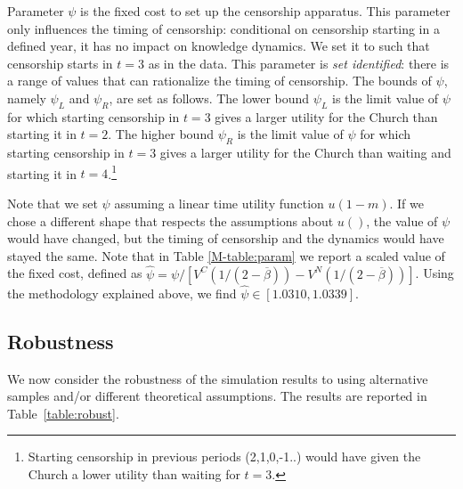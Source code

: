 Parameter $\psi$ is the fixed cost to set up the censorship apparatus. This parameter only influences the timing of censorship: conditional on censorship starting in a defined year, it has no impact on knowledge dynamics. We set it to such that censorship starts in $t=3$ as in the data. This parameter is \textit{set identified}: there is a range of values that can rationalize the timing of censorship. The bounds of $\psi$, namely $\psi_L$ and $\psi_R$, are set as follows. The lower bound $\psi_L$ is the limit value of $\psi$ for which starting censorship in $t=3$ gives a larger utility for the Church than starting it in $t=2$. The higher bound $\psi_R$ is the limit value of $\psi$ for which starting censorship in $t=3$ gives a larger utility for the Church than waiting and starting it in $t=4$.\footnote{Starting censorship in previous periods (2,1,0,-1..) would have given the Church a lower utility than waiting for $t=3$.}

Note that we set $\psi$ assuming a linear time utility function $u(1-m)$. If we chose a different shape that respects the assumptions about $u()$, the value of $\psi$ would have changed, but the timing of censorship and the dynamics would have stayed the same. Note that in Table \ref{M-table:param} we report a scaled value of the fixed cost, defined as $\hat{\psi}=\psi/[ V^C(1/(2-\overline{\beta}))-V^N(1/(2-\overline{\beta}))]$. Using the methodology explained above, we find $\hat{\psi}\in [1.0310,1.0339]$.

\subsection{Robustness}\label{app:robust}


We now consider the robustness of the simulation results to using alternative samples and/or different theoretical assumptions. The results are reported in Table~\ref{table:robust}.

